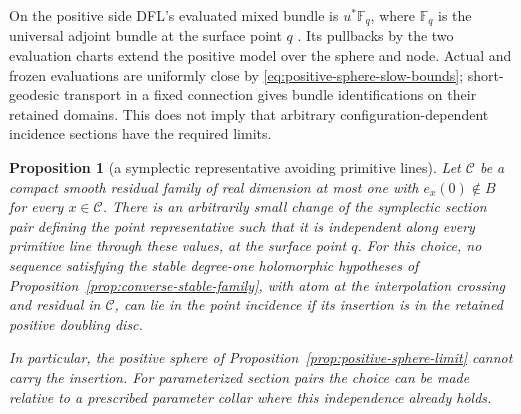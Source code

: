 \documentclass[11pt]{amsart}
\newtheorem{proposition}[theorem]{Proposition}
\theoremstyle{definition}
\theoremstyle{remark}
\theoremstyle{plain}
\newcommand{\cC}{\mathcal{C}}
\begin{document}
On the positive side DFL's evaluated mixed bundle is
$u^*\mathbb F_q$, where $\mathbb F_q$ is the universal
adjoint bundle at the surface point $q$
\cite[equation~(7.9)]{DaeFukLip21a}.
Its pullbacks by the two evaluation charts extend the
positive model over the sphere and node. Actual and frozen
evaluations are uniformly close by
\eqref{eq:positive-sphere-slow-bounds}; short-geodesic
transport in a fixed connection gives bundle identifications
on their retained domains. This does not imply that arbitrary
configuration-dependent incidence sections have the required limits.

\begin{proposition}[a symplectic representative avoiding primitive lines]
\label{prop:positive-primitive-incidence}
Let $\cC$ be a compact smooth residual family of real dimension
at most one with $e_x(0)\notin B$ for every $x\in\cC$.
There is an arbitrarily small change of the symplectic
section pair defining the point representative such that it
is independent along every primitive line through these
values, at the surface point $q$.
For this choice, no sequence satisfying the stable degree-one
holomorphic hypotheses of
Proposition~\ref{prop:converse-stable-family}, with atom at
the interpolation crossing and residual in $\cC$, can lie
in the point incidence if its insertion is in the retained
positive doubling disc.

In particular, the positive sphere of
Proposition~\ref{prop:positive-sphere-limit} cannot carry
the insertion. For parameterized section pairs the choice
can be made relative to a prescribed parameter collar
where this independence already holds.
\end{proposition}
\end{document}
